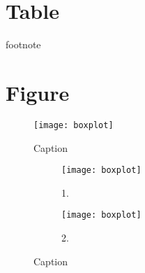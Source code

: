 \section{Table}

\begin{table}[htb]
    \caption{Table Caption.}
    \centering
    \begin{threeparttable}
    \begin{tablenotes}
        \footnotesize{footnote}
    \end{tablenotes}
    \end{threeparttable}
    \label{table: label}
\end{table}

\section{Figure}

\begin{figure}[htb]
    \centering
    \texttt{[image: boxplot]}
    \caption{Caption}
    \label{figure: 1}
\end{figure}

\begin{figure}[htp]
    \centering
    \begin{subfigure}{0.49\textwidth}
      \texttt{[image: boxplot]}
      \caption{1.}
    \end{subfigure}
    \begin{subfigure}{0.49\textwidth}
      \texttt{[image: boxplot]}
      \caption{2.}
    \end{subfigure}
    \caption{Caption}
    \label{figure: 2}
\end{figure}
  
